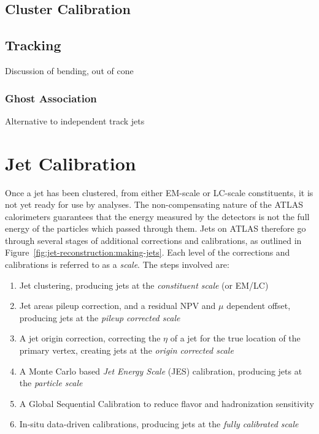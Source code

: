 \subsection{Cluster Calibration}

\subsection{Tracking}

Discussion of bending, out of cone

\subsubsection{Ghost Association}

Alternative to independent track jets


\section{Jet Calibration}

Once a jet has been clustered, from either EM-scale or LC-scale constituents, it is not yet ready for use by analyses. The non-compensating nature of the ATLAS calorimeters guarantees that the energy measured by the detectors is not the full energy of the particles which passed through them. Jets on ATLAS therefore go through several stages of additional corrections and calibrations, as outlined in Figure~\ref{fig:jet-reconstruction:making-jets}. Each level of the corrections and calibrations is referred to as a \textit{scale}. The steps involved are:

\begin{enumerate}
	\item Jet clustering, producing jets at the \textit{constituent scale} (or EM/LC)
	\item Jet areas pileup correction, and a residual NPV and $\mu$ dependent offset, producing jets at the \textit{pileup corrected scale}
	\item A jet origin correction, correcting the $\eta$ of a jet for the true location of the primary vertex, creating jets at the \textit{origin corrected scale}
	\item A Monte Carlo based \textit{Jet Energy Scale} (JES) calibration, producing jets at the \textit{particle scale}
	\item A Global Sequential Calibration to reduce flavor and hadronization sensitivity
	\item In-situ data-driven calibrations, producing jets at the \textit{fully calibrated scale}
\end{enumerate}

